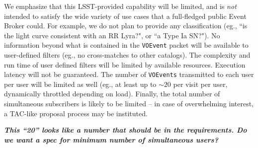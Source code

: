 \documentclass[12pt]{article}
\newcommand{\code}[1]{\texttt{#1}}
\newcommand{\annotate}[1]{{\color{magenta}\large\textbf{\emph{#1}}}}
\newcommand{\VOEvent}{\code{VOEvent}\xspace}
\newcommand{\VOEvents}{\code{VOEvents}\xspace}
\begin{document}
We emphasize that this LSST-provided capability will be limited, and is {\em not} intended to satisfy the wide variety of use cases that a full-fledged public Event Broker could. For example, we do not plan to provide any classification (eg., ``is the light curve consistent with an RR Lyra?", or ``a Type Ia SN?"). No information beyond what is contained in the \VOEvent packet will be available to user-defined filters (eg., no cross-matches to other catalogs). The complexity and run time of user defined filters will be limited by available resources. Execution latency will not be guaranteed. The number of \VOEvents transmitted to each user per user will be limited as well (eg., at least up to $\sim 20$ per visit per user, dynamically throttled depending on load). Finally, the total number of simultaneous subscribers is likely to be limited -- in case of overwhelming interest, a TAC-like proposal process may be instituted.

\annotate{This ``20'' looks like a number that should be in the requirements. Do we want a spec for minimum number of simultaneous users?}
\end{document}
